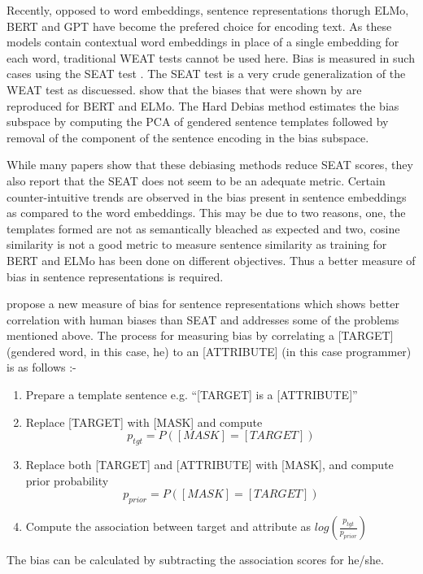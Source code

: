\documentclass[11pt,a4paper]{article}
\begin{document}
\begin{enumerate}
    Recently, opposed to word embeddings, sentence representations thorugh ELMo, BERT and GPT have become the prefered choice for encoding text. As these models contain contextual word embeddings in place of a single embedding for each word, traditional WEAT tests cannot be used here. Bias is measured in such cases using the SEAT test \cite{Liang2019TowardsDS,may-etal-2019-measuring}. The SEAT test is a very crude generalization of the WEAT test as discuessed. 
    \citet{may-etal-2019-measuring} show that the biases that were shown by \citet{Caliskan183} are reproduced for BERT and ELMo. The Hard Debias method estimates the bias subspace by computing the PCA of gendered sentence templates followed by removal of the component of the sentence encoding in the bias subspace.
    
    While many papers show that these debiasing methods reduce SEAT scores, they also report that the SEAT does not seem to be an adequate metric. Certain counter-intuitive trends are observed in the bias present in sentence embeddings as compared to the word embeddings. This may be due to two reasons, one, the templates formed are not as semantically bleached as expected and two, cosine similarity is not a good metric to measure sentence similarity as training for BERT and ELMo has been done on different objectives. Thus a better measure of bias in sentence representations is required.
    
    \citet{Kurita_Vyas_Pareek_Black_Tsvetkov_2019} propose a new measure of bias for sentence representations which shows better correlation with human biases than SEAT and addresses some of the problems mentioned above. The process for measuring bias by correlating a [TARGET] (gendered word, in this case, he) to an [ATTRIBUTE] (in this case programmer) is as follows :- 
    \begin{enumerate}
        \item Prepare a template sentence e.g. ``[TARGET] is a [ATTRIBUTE]''
        \item Replace [TARGET] with [MASK] and compute 
        \[p_{tgt}= P([MASK]=[TARGET])\]
        \item Replace both [TARGET] and [ATTRIBUTE] with [MASK], and compute prior probability 
        \[p_{prior} = P([MASK]=[TARGET])\]
        \item Compute the association between target and attribute as $log(\frac{p_{tgt}}{p_{prior}})$
    \end{enumerate}
    The bias can be calculated by subtracting the association scores for he/she.
    

\end{enumerate}
\end{document}
